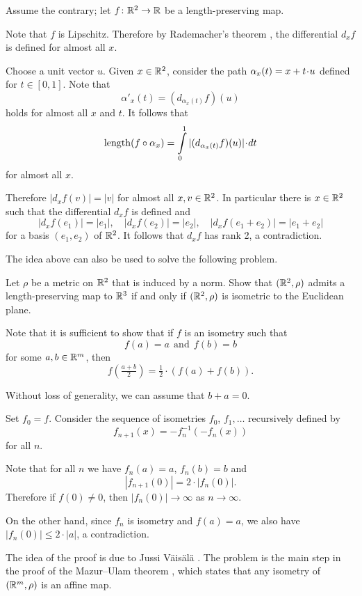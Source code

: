 Assume the contrary;
let $f\colon\mathbb{R}^2\to \mathbb{R}$ be a length-preserving map.

Note that $f$ is Lipschitz.
Therefore by Rademacher's theorem \cite{rademacher}, the differential $d_xf$ is defined for  almost all $x$.

Choose a unit vector $u$.
Given $x\in\mathbb{R}^2$,
consider the path $\alpha_x(t)\z=x+t\cdot u$ defined for $t\in [0,1]$.
Note that  
\[\alpha'_x(t)=(d_{\alpha_x(t)}f)(u)\]
holds for almost all $x$ and $t$.
It follows that 
\[\length(f\circ\alpha_x)=\int\limits_0^1 |(d_{\alpha_x(t)}f)(u)| \cdot dt\]
for almost all $x$.

Therefore $|d_xf(v)|=|v|$ for almost all $x,v\in\mathbb{R}^2$.
In particular there is $x\in\mathbb{R}^2$ such that the differential $d_xf$ is defined 
and 
\[|d_xf(e_1)|=|e_1|,
\quad
|d_xf(e_2)|=|e_2|,
\quad
|d_xf(e_1+e_2)|=|e_1+e_2|\]
for a basis $(e_1,e_2)$ of $\mathbb{R}^2$.
It follows that $d_xf$ has rank 2, a contradiction. \qeds 


The idea above can also be used to solve the following problem.

\begin{pr} Let $\rho$ be a metric on $\mathbb{R}^2$ that is induced by a norm.
Show that $(\mathbb{R}^2,\rho)$ admits 
a length-preserving map
to $\mathbb{R}^3$ 
if and only if 
$(\mathbb{R}^2,\rho)$ is isometric to the Euclidean plane.
\end{pr}








Note that it is sufficient to show that 
if $f$ is an isometry such that
\[f(a)=a\ \ \text{and}\ \ f(b)=b\]
for some $a,b\in\mathbb{R}^m$,
then 
\[f(\tfrac{a+b}2)=\tfrac12\cdot(f(a)+f(b)).\]


Without loss of generality, we can assume that $b+a=0$.

Set $f_0=f$.
Consider the sequence of isometries $f_0$, $f_1,\dots$ recursively defined by
\[f_{n+1}(x)= -f_n^{-1}(-f_n(x))\]
for all $n$.

Note that for all $n$ we have $f_n(a)=a$, $f_n(b)=b$ and 
$$|f_{n+1}(0)|=2\cdot|f_n(0)|.$$
Therefore  
if $f(0)\ne 0$,
then $|f_n(0)|\to\infty$ as $n\to\infty$.

On the other hand, since $f_n$ is isometry and $f(a)=a$,
we also have $|f_n(0)|\le 2\cdot |a|$, a contradiction.
\qeds

The idea of the proof is due to  Jussi V\"ais\"al\"a \cite{vaisala}.
The problem is the main step in the proof of the Mazur--Ulam theorem \cite{mazur-ulam},
which states that any isometry of $(\mathbb{R}^m,\rho)$ is an affine map. 


